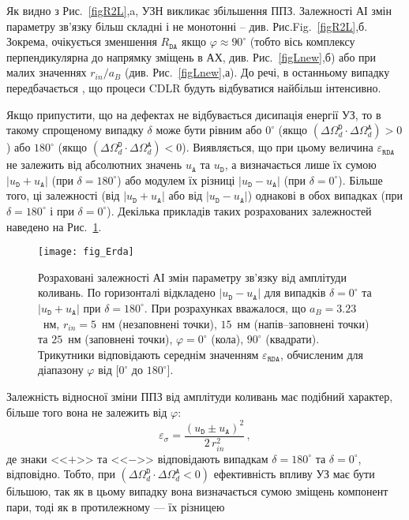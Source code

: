 Як видно з Рис.~\ref{figR2L},a, УЗН викликає збільшення ППЗ.
Залежності АІ змін параметру зв'язку більш складні і не монотонні -- див. Рис.Fig.~\ref{figR2L},б.
Зокрема, очікується  зменшення $R_{\mathtt{DA}}$ якщо $\varphi\approx90^\circ$ (тобто вісь комплексу перпендикулярна до напрямку зміщень в АХ, див. Рис.~\ref{figLnew},б)
або при малих значеннях $r_{in}/a_B$ (див. Рис.~\ref{figLnew},а).
До речі, в останньому випадку передбачається \cite{CDLR:JAP1995,CDLR:JAP}, що процеси CDLR будуть відбуватися найбільш інтенсивно.

Якщо припустити, що на дефектах не відбувається дисипація енергії УЗ, то в такому спрощеному випадку
$\delta$ може бути рівним або $0^\circ$ (якщо $(\Delta\Omega_d^\mathtt{D}\cdot\Delta\Omega_d^\mathtt{A})>0$)
або $180^\circ$ (якщо $(\Delta\Omega_d^\mathtt{D}\cdot\Delta\Omega_d^\mathtt{A})<0$).
Виявляється, що при цьому величина $\varepsilon_{\mathtt{RDA}}$ не залежить від абсолютних значень $u_\mathtt{A}$ та $u_\mathtt{D}$,
а визначається лише їх сумою $|u_\mathtt{D}+u_\mathtt{A}|$ (при $\delta=180^\circ$)
або модулем їх різниці $|u_\mathtt{D}-u_\mathtt{A}|$ (при $\delta=0^\circ$).
Більше того, ці залежності (від $|u_\mathtt{D}+u_\mathtt{A}|$ або від $|u_\mathtt{D}-u_\mathtt{A}|$) однакові в обох випадках
(при $\delta=180^\circ$ і при $\delta=0^\circ$).
Декілька прикладів таких розрахованих залежностей наведено на Рис.~\ref{fig_Erda}.

\begin{figure}
\center
\texttt{[image: fig\_Erda]}
\caption{\label{fig_Erda}
Розраховані залежності АІ змін параметру зв'язку від амплітуди коливань.
По горизонталі відкладено $|u_\mathtt{D}-u_\mathtt{A}|$ для випадків $\delta=0^\circ$ та
$|u_\mathtt{D}+u_\mathtt{A}|$ при $\delta=180^\circ$.
При розрахунках вважалося, що
$a_B=3.23$~нм,
$r_{in}=5$~нм (незаповнені точки), $15$~нм (напів--заповнені точки) та $25$~нм (заповнені точки),
$\varphi=0^\circ$ (кола), $90^\circ$ (квадрати).
Трикутники відповідають середнім значенням $\varepsilon_{\mathtt{RDA}}$,
обчисленим для діапазону $\varphi$ від $[0^\circ$ до $180^\circ]$.
}%
\end{figure}

Залежність відносної зміни ППЗ від амплітуди коливань має подібний характер, більше того
вона не залежить від $\varphi$:
\begin{equation}
\label{eqEpsSig}
\varepsilon_{\sigma}=\frac{(u_\mathtt{D}\pm u_\mathtt{A})^2}{2\,r_{in}^2}\,,
\end{equation}
де
знаки <<$+$>> та <<$-$>> відповідають випадкам $\delta=180^\circ$ та $\delta=0^\circ$, відповідно.
Тобто, при $(\Delta\Omega_d^\mathtt{D}\cdot\Delta\Omega_d^\mathtt{A}<0)$ ефективність впливу УЗ має бути більшою,
так як в цьому випадку вона визначається сумою зміщень компонент пари,
тоді як в протилежному --- їх різницею



